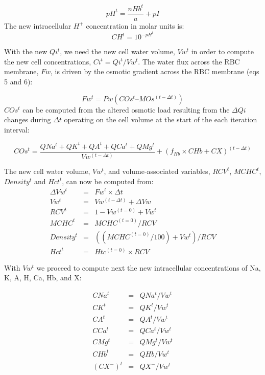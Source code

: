 \documentclass[a4paper]{article}
\newcommand{\med}[1]{M#1}
\newcommand{\cell}[1]{C#1}
\newcommand{\MOs}{\med{Os}}
\newcommand{\CNa}{\cell{Na}}
\newcommand{\CK}{\cell{K}}
\newcommand{\CA}{\cell{A}}
\newcommand{\CHb}{\cell{Hb}}
\newcommand{\COs}{\cell{Os}}
\newcommand{\CCa}{\cell{Ca}}
\newcommand{\CMg}{\cell{Mg}}
\newcommand{\CX}{\cell{X}}
\begin{document}
\begin{equation}
pH^t = \frac{nHb^t}{a} + pI
\end{equation}
The new intracellular $H^+$ concentration in molar units is:
\begin{equation}
CH^t = 10^{-pH^t}
\end{equation}

With the new $Qi^t$, we need the new cell water volume, $Vw^t$ in order to compute the new cell concentrations, $Ci^t = Qi^t/Vw^t$.  The water flux across the RBC membrane, $Fw$, is driven by the osmotic gradient across the RBC membrane (eqs 5 and 6): 
\setcounter{equation}{0}
\renewcommand{\theequation}{22\alph{equation}}

\begin{equation}
Fw^t = Pw(\COs^t – \MOs^{(t-\Delta t)}) 
\end{equation}
$\COs^t$ can be computed from the altered osmotic load resulting from the $\Delta Qi$ changes during $\Delta t$ operating on the cell volume at the start of the each iteration interval: 

\begin{equation}
COs^t = \frac{QNa^t + QK^t + QA^t + QCa^t + QMg^t}{Vw^{(t-\Delta t)}}  + (f_{Hb}\times\CHb + \CX )^{(t-\Delta t)}
\end{equation}


\setcounter{equation}{0}
\renewcommand{\theequation}{23\alph{equation}}

The new cell water volume, $Vw^t$, and volume-associated variables, $RCV^t$, $MCHC^t$, $Density^t$ and $Hct^t$, can now be computed from: 
\begin{eqnarray}
\Delta Vw^t &=& Fw^t\times\Delta t \\
Vw^t &=& Vw^{(t-\Delta t)} + \Delta Vw \\
RCV^t &=& 1-Vw^{(t=0)} + Vw^t  \\
MCHC^t &=& MCHC^{(t=0)}/RCV  \\
Density^t &=& ((MCHC^{(t=0)}/100) + Vw^t)/RCV  \\
Hct^t &=& Htc^{(t=0)}\times RCV  
\end{eqnarray}

With $Vw^t$ we proceed to compute next the new intracellular concentrations of Na, K, A, H, Ca, Hb, and X:

\setcounter{equation}{0}
\renewcommand{\theequation}{24\alph{equation}}

\begin{eqnarray}
\CNa^t &=& QNa^t/Vw^t \\
\CK^t &=& QK^t/Vw^t \\
\CA^t &=& QA^t/Vw^t  \\
\CCa^t &=& QCa^t/Vw^t  \\
\CMg^t &=& QMg^t/Vw^t  \\
\CHb^t &=& QHb/Vw^t \\
(\CX^{-})^t &=& QX^{-} /Vw^t  
\end{eqnarray}
\end{document}

